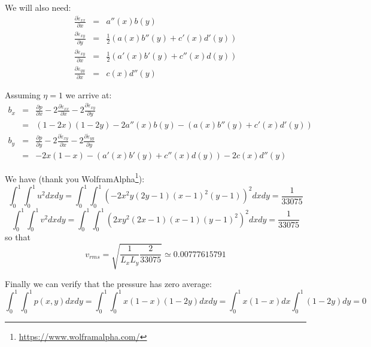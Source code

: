 We will also need:
\begin{eqnarray}
\frac{\partial \dot{\varepsilon}_{xx}}{\partial x}  &=& a''(x) b(y) \\
\frac{\partial \dot{\varepsilon}_{xy}}{\partial y}  &=& \frac{1}{2} ( a(x) b''(y) +  c'(x) d'(y)   )\\
\frac{\partial \dot{\varepsilon}_{xy}}{\partial x}  &=& \frac{1}{2} ( a'(x) b'(y) +  c''(x) d(y)   ) \\
\frac{\partial \dot{\varepsilon}_{yy}}{\partial x}  &=& c(x) d''(y)
\end{eqnarray}

Assuming $\eta=1$ we arrive at:
\begin{eqnarray}
b_x 
&=&  \frac{\partial p}{\partial x} 
-2\frac{\partial \dot{\varepsilon}_{xx}}{\partial x}  
-2\frac{\partial \dot{\varepsilon}_{xy}}{\partial y}  \\
&=&  (1-2x)(1-2y) - 2a''(x) b(y) - ( a(x) b''(y) +  c'(x) d'(y)   ) \\
b_y 
&=&  \frac{\partial p}{\partial y}  
-2\frac{\partial \dot{\varepsilon}_{xy}}{\partial x} 
-2\frac{\partial \dot{\varepsilon}_{yy}}{\partial y} \\
&=& -2 x(1-x) - ( a'(x) b'(y) +  c''(x) d(y)   ) -2  c(x) d''(y)
\end{eqnarray}

We have (thank you WolframAlpha\footnote{\url{https://www.wolframalpha.com/}}):
\[
\int_{0}^{1}\int_{0}^{1} u^2 dxdy= 
\int_{0}^{1}\int_{0}^{1} 
( -2x^2y(2y-1)(x-1)^2(y-1) )^2 
dxdy = \frac{1}{33075}
\]
\[
\int_{0}^{1}\int_{0}^{1} v^2 dxdy= 
\int_{0}^{1}\int_{0}^{1} 
( 2xy^2(2x-1)(x-1)(y-1)^2 )^2
dxdy = \frac{1}{33075}
\]
so that
\[
v_{rms} = \sqrt{\frac{1}{L_xL_y} \frac{2}{33075}  }
\simeq 0.00777615791
\]

Finally we can verify that the pressure has zero average:
\[
\int_0^1 \int_0^1 p(x,y) dx dy = 
\int_0^1 \int_0^1  x(1-x)(1-2y) dxdy= 
\int_0^1  x(1-x) dx \int_0^1  (1-2y) dy=0 
\]




